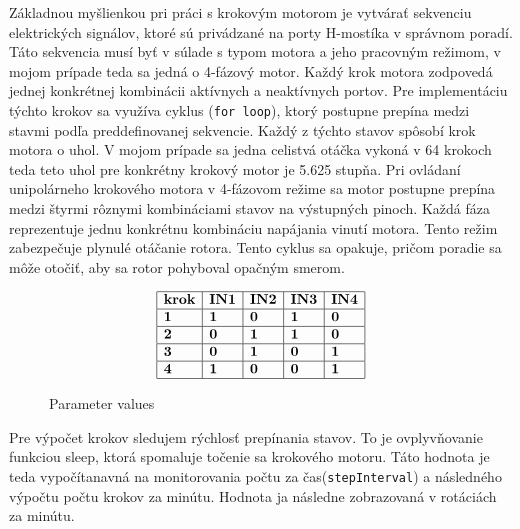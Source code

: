 \documentclass[a4paper, 11pt]{article}
\begin{document}
Základnou myšlienkou pri práci s krokovým motorom je vytvárať sekvenciu elektrických signálov, ktoré sú privádzané na porty H-mostíka v správnom poradí. Táto sekvencia musí byť v súlade s typom motora a jeho pracovným režimom, v mojom prípade teda sa jedná o 4-fázový motor. Každý krok motora zodpovedá jednej konkrétnej kombinácii aktívnych a neaktívnych portov. Pre implementáciu týchto krokov sa využíva cyklus (\texttt{for loop}), ktorý postupne prepína medzi stavmi podľa preddefinovanej sekvencie. Každý z týchto stavov spôsobí krok motora o uhol. V mojom prípade sa jedna celistvá otáčka vykoná v 64 krokoch teda teto uhol pre konkrétny krokový motor je 5.625 stupňa.
Pri ovládaní unipolárneho krokového motora v 4-fázovom režime sa motor postupne prepína medzi štyrmi rôznymi kombináciami stavov na výstupných pinoch. Každá fáza reprezentuje jednu konkrétnu kombináciu napájania vinutí motora. Tento režim zabezpečuje plynulé otáčanie rotora. Tento cyklus sa opakuje, pričom poradie sa môže otočiť, aby sa rotor pohyboval opačným smerom.
\begin{figure}[H]
    \centering
    \[
    \begin{array}{|l|l|l|l|l|}
    \hline
    \textbf{krok} & \textbf{IN1} & \textbf{IN2} & \textbf{IN3} & \textbf{IN4}\\ \hline
    \textbf{1} & \textbf{1} & \textbf{0} & \textbf{1} & \textbf{0}\\ \hline
    \textbf{2} & \textbf{0} & \textbf{1} & \textbf{1} & \textbf{0}\\ \hline
    \textbf{3} & \textbf{0} & \textbf{1} & \textbf{0} & \textbf{1}\\ \hline
    \textbf{4} & \textbf{1} & \textbf{0} & \textbf{0} & \textbf{1}\\ \hline
    \end{array}
    \]
    \caption{Parameter values}
\end{figure}
Pre výpočet krokov sledujem rýchlosť prepínania stavov. To je ovplyvňovanie funkciou sleep, ktorá spomaluje točenie sa krokového motoru. Táto hodnota je teda vypočítanavná na monitorovania počtu za čas(\texttt{stepInterval}) a následného výpočtu počtu krokov za minútu. Hodnota ja následne zobrazovaná v rotáciách za minútu.
\end{document}
